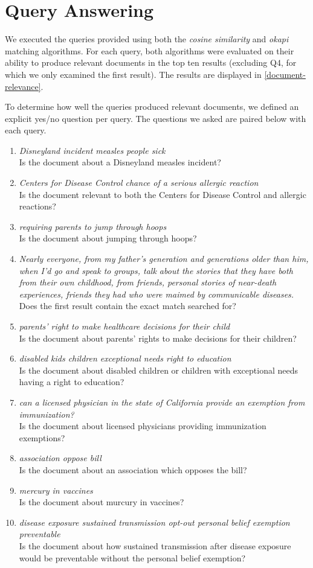 \documentclass{report}
\newcommand{\query}[2]{\item\textit{#1}\\#2}
\begin{document}
\section{Query Answering}
We executed the queries provided using both the \textit{cosine
  similarity} and \textit{okapi} matching algorithms. For each query,
both algorithms were evaluated on their ability to produce relevant
documents in the top ten results (excluding Q4, for which we only
examined the first result). The results are displayed in
\cref{document-relevance}.

To determine how well the queries produced relevant documents, we
defined an explicit yes/no question per query. The questions we asked
are paired below with each query.

\begin{enumerate}[Q1:]
  \query{Disneyland incident measles people sick}{Is the document
about a Disneyland measles incident?}

  \query{Centers for Disease Control chance of a serious allergic
reaction}{Is the document relevant to both the Centers for Disease
Control and allergic reactions?}

  \query{requiring parents to jump through hoops}{Is the document
about jumping through hoops?}

  \query{Nearly everyone, from my father's generation and generations
older than him, when I'd go and speak to groups, talk about the
stories that they have both from their own childhood, from friends,
personal stories of near-death experiences, friends they had who were
maimed by communicable diseases.}{Does the first result contain the
exact match searched for?}

  \query{parents' right to make healthcare decisions for their
child}{Is the document about parents' rights to make decisions for
their children?}

  \query{disabled kids children exceptional needs right to
education}{Is the document about disabled children or children with
exceptional needs having a right to education?}

  \query{can a licensed physician in the state of California provide
an exemption from immunization?}{Is the document about licensed
physicians providing immunization exemptions?}

  \query{association oppose bill}{Is the document about an association
which opposes the bill?}

  \query{mercury in vaccines}{Is the document about murcury in
vaccines?}

  \query{disease exposure sustained transmission opt-out personal
belief exemption preventable}{Is the document about how sustained transmission after disease exposure would be preventable without the personal belief exemption?}
\end{enumerate}
\end{document}
